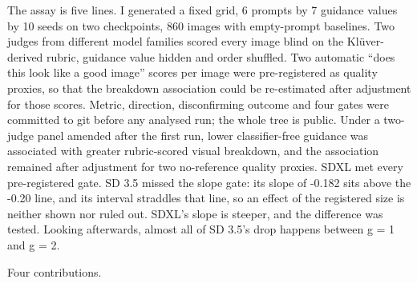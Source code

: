 \documentclass[11pt]{article}
\begin{document}
The assay is five lines. I generated a fixed grid, 6 prompts by 7 guidance
values by 10 seeds on two checkpoints, 860 images with empty-prompt baselines.
Two judges from different model families scored every image blind on the
Klüver-derived rubric, guidance value hidden and order shuffled. Two automatic
``does this look like a good image'' scores per image were pre-registered as
quality proxies, so that the breakdown association could be re-estimated after
adjustment for those scores. Metric, direction, disconfirming outcome and four
gates were committed to git before any analysed run; the whole tree is public.
Under a two-judge panel amended after the first run, lower classifier-free
guidance was associated with greater rubric-scored visual breakdown, and the
association remained after adjustment for two no-reference quality proxies. SDXL
met every pre-registered gate. SD 3.5 missed the slope gate: its slope of -0.182
sits above the -0.20 line, and its interval straddles that line, so an effect of
the registered size is neither shown nor ruled out. SDXL's slope is steeper, and
the difference was tested. Looking afterwards, almost all of SD 3.5's drop
happens between g = 1 and g = 2.

Four contributions.
\end{document}

